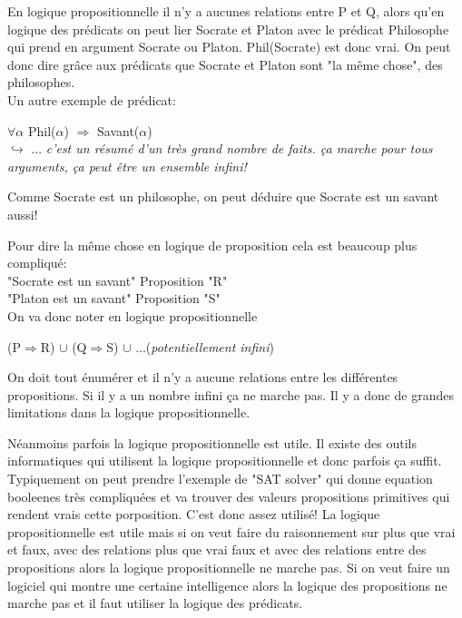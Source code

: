 En logique propositionnelle il n'y a aucunes relations entre P et Q, alors qu'en logique des prédicats on peut lier Socrate et Platon avec le prédicat Philosophe qui prend en argument Socrate ou Platon. Phil(Socrate) est donc vrai. On peut donc dire grâce aux prédicats que Socrate et Platon sont "la même chose", des philosophes.\\

Un autre exemple de prédicat:

\begin{center}
$\forall \alpha$ Phil($\alpha$) $\Rightarrow$ Savant($\alpha$)\\
\vspace{3mm}
$\hookrightarrow$ ... \textit{c'est un résumé d'un très grand nombre de faits. ça marche pour tous arguments, ça peut être un ensemble infini!}
\end{center}
Comme Socrate est un philosophe, on peut déduire que Socrate est un savant aussi!

Pour dire la même chose en logique de proposition cela est beaucoup plus compliqué: \\

"Socrate est un savant" Proposition "R"\\
\indent "Platon est un savant" Proposition "S"\\

On va donc noter en logique propositionnelle
\begin{center}
(P$\Rightarrow$R) $\cup$ (Q$\Rightarrow$S) $\cup$ ...(\textit{potentiellement infini})
\end{center}

On doit tout énumérer et il n'y a aucune relations entre les différentes propositions. Si il y a un nombre infini ça ne marche pas. Il y a donc de grandes limitations dans la logique propositionnelle.

Néanmoins parfois la logique propositionnelle est utile. Il existe des outils informatiques qui utilisent la logique propositionnelle et donc parfois ça suffit. Typiquement on peut prendre l'exemple de "SAT solver" qui donne equation booleenes très compliquées et va trouver des valeurs propositions primitives qui rendent vrais cette porposition. C'est donc assez utilisé! La logique propositionnelle est utile mais si on veut faire du raisonnement sur plus que vrai et faux, avec des relations plus que vrai faux et avec des relations entre des propositions alors la logique propositionnelle ne marche pas. Si on veut faire un logiciel qui montre une certaine intelligence alors la logique des propositions ne marche pas et il faut utiliser la logique des prédicats.\\

